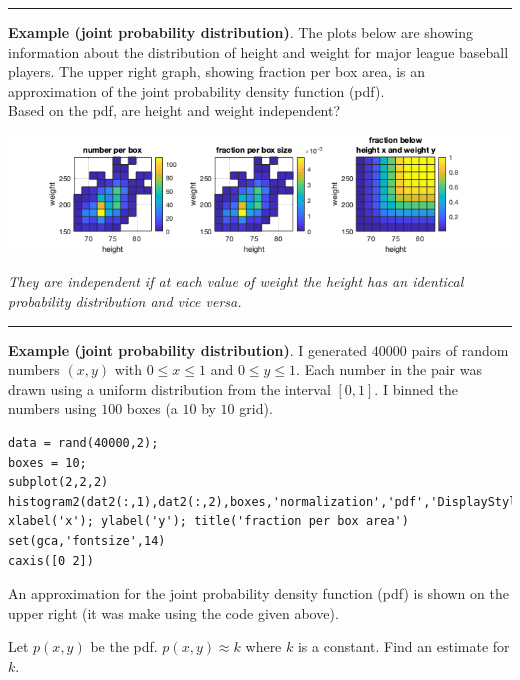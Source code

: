 \documentclass[12pt,letterpaper,noanswers]{exam}
\begin{document}
\vspace{0.2cm}
\hrule
\vspace{0.2cm}

\noindent\textbf{Example (joint probability distribution)}.
The plots below are showing information about the distribution of height and weight for major league baseball players.
The upper right graph, showing fraction per box area, is an approximation of the joint probability density function (pdf).  \\

Based on the pdf, are height and weight independent?




\hspace{-0.5in}\includegraphics[width=0.9\linewidth]{img/C14joint.png}

\emph{They are independent if at each value of weight the height has an identical probability distribution and vice versa.}




\vspace{0.2cm}
\hrule
\vspace{0.2cm}

\noindent\textbf{Example (joint probability distribution)}.
I generated $40000$ pairs of random numbers $(x,y)$ with $0\leq x\leq 1$ and $0\leq y \leq 1$.  Each number in the pair was drawn using a uniform distribution from the interval $[0,1]$.  I binned the numbers using $100$ boxes (a $10$ by $10$ grid).

\begin{verbatim}
data = rand(40000,2);
boxes = 10;
subplot(2,2,2)
histogram2(dat2(:,1),dat2(:,2),boxes,'normalization','pdf','DisplayStyle','tile')
xlabel('x'); ylabel('y'); title('fraction per box area')
set(gca,'fontsize',14)
caxis([0 2])
\end{verbatim}

An approximation for the joint probability density function (pdf) is shown on the upper right (it was make using the code given above).

Let $p(x,y)$ be the pdf.  $p(x,y) \approx k$ where $k$ is a constant.  Find an estimate for $k$.
\end{document}
